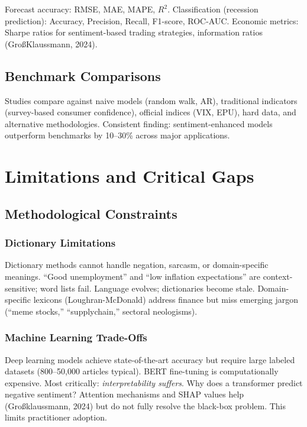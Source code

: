 \documentclass[12pt,a4paper]{article}
\begin{document}
Forecast accuracy: RMSE, MAE, MAPE, $R^2$. Classification (recession prediction): Accuracy, Precision, Recall, F1-score, ROC-AUC. Economic metrics: Sharpe ratios for sentiment-based trading strategies, information ratios (GroßKlaussmann, 2024).

\subsection{Benchmark Comparisons}

Studies compare against naive models (random walk, AR), traditional indicators (survey-based consumer confidence), official indices (VIX, EPU), hard data, and alternative methodologies. Consistent finding: sentiment-enhanced models outperform benchmarks by 10--30\% across major applications.

\section{Limitations and Critical Gaps}
\label{sec:limitations}

\subsection{Methodological Constraints}
\label{subsec:limitations_method}

\subsubsection{Dictionary Limitations}

Dictionary methods cannot handle negation, sarcasm, or domain-specific meanings. ``Good unemployment'' and ``low inflation expectations'' are context-sensitive; word lists fail. Language evolves; dictionaries become stale. Domain-specific lexicons (Loughran-McDonald) address finance but miss emerging jargon (``meme stocks,'' ``supplychain,'' sectoral neologisms).

\subsubsection{Machine Learning Trade-Offs}

Deep learning models achieve state-of-the-art accuracy but require large labeled datasets (800--50,000 articles typical). BERT fine-tuning is computationally expensive. Most critically: \textit{interpretability suffers}. Why does a transformer predict negative sentiment? Attention mechanisms and SHAP values help (Großklaussmann, 2024) but do not fully resolve the black-box problem. This limits practitioner adoption.
\end{document}
